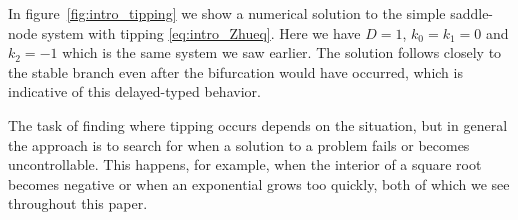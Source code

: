 In figure~\ref{fig:intro_tipping} we show a numerical solution to the simple saddle-node system with tipping \eqref{eq:intro_Zhueq}. Here we have $D=1$, $k_0=k_1=0$ and $k_2=-1$ which is the same system we saw earlier. The solution follows closely to the stable branch even after the bifurcation would have occurred, which is indicative of this delayed-typed behavior.


The task of finding where tipping occurs depends on the situation, but in general the approach is to search for when a solution to a problem fails or becomes uncontrollable. This happens, for example, when the interior of a square root becomes negative or when an exponential grows too quickly, both of which we see throughout this paper.
